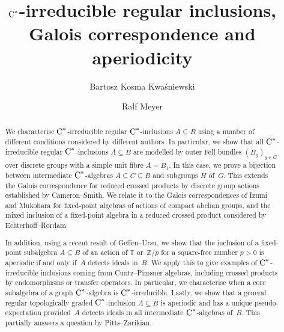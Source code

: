 \documentclass[a4paper]{amsart}
\theoremstyle{plain}
\theoremstyle{definition}
\theoremstyle{remark}
\numberwithin{theorem}{section}
\numberwithin{equation}{section}
\newcommand*{\nb}{\nobreakdash}
\newcommand*{\Z}{\mathbb Z}
\newcommand*{\T}{\mathbb T}%
\newcommand*{\Cst}{\textup C^*}%
\begin{document}
\title[C*-irreducible regular inclusions]{\(\Cst\)-irreducible regular inclusions,\\
Galois correspondence and aperiodicity}

\author{Bartosz Kosma Kwa\'sniewski}
 \address{Institute of Mathematics\\
   University  of Bia\l ystok\\
   ul.\@ K.~Cio\l kowskiego 1M\\
   15-245 Bia\l ystok\\
   Poland}

\author{Ralf Meyer}
\address{Mathematisches Institut\\
 Georg-August-Universit\"at G\"ottingen\\
 Bunsenstra\ss e 3--5\\
 37073 G\"ottingen\\
 Germany}

\begin{abstract}
  We characterise \(\Cst\)\nb-irreducible regular
  \(\Cst\)\nb-inclusions \(A\subseteq B\) using a number of different
  conditions considered by different authors.
  In particular, we show that all \(\Cst\)\nb-irreducible regular
  \(\Cst\)\nb-inclusions \(A\subseteq B\) are modelled by outer Fell
  bundles \((B_{g})_{g\in G}\) over discrete groups with a simple unit
  fibre \(A=B_1\).
  In this case, we prove a bijection between intermediate
  \(\Cst\)\nb-algebras \(A\subseteq C \subseteq B\) and subgroups
  \(H\) of~\(G\).
  This extends the Galois correspondence for reduced crossed products
  by discrete group actions established by Cameron--Smith.
  We relate it to the Galois correspondences of Izumi and Mukohara
  for fixed-point algebras of actions of compact abelian groups, and
  the mixed inclusion of a fixed-point algebra in a reduced crossed
  product considered by Echterhoff--Rørdam.

  In addition, using a recent result of Geffen--Ursu, we show that
  the inclusion of a fixed-point subalgebra \(A\subseteq B\) of an
  action of \(\T\)
  or~\(\Z/p\) for a square-free number \(p>0\) is aperiodic if
  and only if~\(A\) detects ideals in~\(B\).
  We apply this to give examples of \(\Cst\)\nb-irreducible inclusions
  coming from Cuntz--Pimsner algebras, including crossed products by
  endomorphisms or transfer operators.
  In particular, we characterise when a core subalgebra of a graph
  \(\Cst\)\nb-algebra is \(\Cst\)\nb-irreducible.
  Lastly,  we show that a general regular topologically graded
  \(\Cst\)\nb-inclusion \(A\subseteq B\) is aperiodic and has a unique
  pseudo-expectation provided~\(A\) detects ideals in all intermediate
  \(\Cst\)\nb-algebras of~\(B\).
  This partially answers a question by Pitts--Zarikian.
\end{abstract}
\maketitle
\setcounter{tocdepth}{1}
\end{document}
